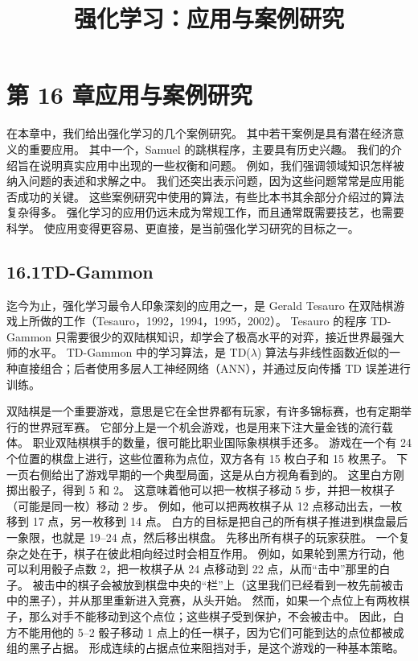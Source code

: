 \documentclass[UTF8, 12pt, fontset=fandol, oneside]{ctexart}
\title{强化学习：应用与案例研究}
\author{}
\date{}
\begin{document}
\maketitle

\section*{第 16 章\quad 应用与案例研究}

在本章中，我们给出强化学习的几个案例研究。
其中若干案例是具有潜在经济意义的重要应用。
其中一个，Samuel 的跳棋程序，主要具有历史兴趣。
我们的介绍旨在说明真实应用中出现的一些权衡和问题。
例如，我们强调领域知识怎样被纳入问题的表述和求解之中。
我们还突出表示问题，因为这些问题常常是应用能否成功的关键。
这些案例研究中使用的算法，有些比本书其余部分介绍过的算法复杂得多。
强化学习的应用仍远未成为常规工作，而且通常既需要技艺，也需要科学。
使应用变得更容易、更直接，是当前强化学习研究的目标之一。

\subsection*{16.1\quad TD-Gammon}

迄今为止，强化学习最令人印象深刻的应用之一，是 Gerald Tesauro 在双陆棋游戏上所做的工作（Tesauro，1992，1994，1995，2002）。
Tesauro 的程序 TD-Gammon 只需要很少的双陆棋知识，却学会了极高水平的对弈，接近世界最强大师的水平。
TD-Gammon 中的学习算法，是 TD($\lambda$) 算法与非线性函数近似的一种直接组合；后者使用多层人工神经网络（ANN），并通过反向传播 TD 误差进行训练。

双陆棋是一个重要游戏，意思是它在全世界都有玩家，有许多锦标赛，也有定期举行的世界冠军赛。
它部分上是一个机会游戏，也是用来下注大量金钱的流行载体。
职业双陆棋棋手的数量，很可能比职业国际象棋棋手还多。
游戏在一个有 24 个位置的棋盘上进行，这些位置称为点位，双方各有 15 枚白子和 15 枚黑子。
下一页右侧给出了游戏早期的一个典型局面，这是从白方视角看到的。
这里白方刚掷出骰子，得到 5 和 2。
这意味着他可以把一枚棋子移动 5 步，并把一枚棋子（可能是同一枚）移动 2 步。
例如，他可以把两枚棋子从 12 点移动出去，一枚移到 17 点，另一枚移到 14 点。
白方的目标是把自己的所有棋子推进到棋盘最后一象限，也就是 19--24 点，然后移出棋盘。
先移出所有棋子的玩家获胜。
一个复杂之处在于，棋子在彼此相向经过时会相互作用。
例如，如果轮到黑方行动，他可以利用骰子点数 2，把一枚棋子从 24 点移动到 22 点，从而“击中”那里的白子。
被击中的棋子会被放到棋盘中央的“栏”上（这里我们已经看到一枚先前被击中的黑子），并从那里重新进入竞赛，从头开始。
然而，如果一个点位上有两枚棋子，那么对手不能移动到这个点位；这些棋子受到保护，不会被击中。
因此，白方不能用他的 5--2 骰子移动 1 点上的任一棋子，因为它们可能到达的点位都被成组的黑子占据。
形成连续的占据点位来阻挡对手，是这个游戏的一种基本策略。
\end{document}
